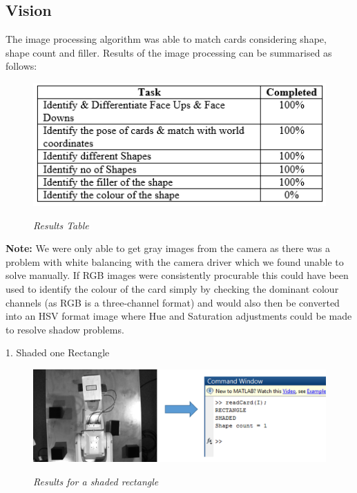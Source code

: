 \subsection{Vision}
The image processing algorithm was able to match cards considering shape, shape count and filler. Results of the image processing can be summarised as follows:
\begin{figure}[position = here]
	\begin{centering}
		\includegraphics[scale=0.8]{./sachiths_images/image7.png}\\
		\caption[]{\textit{Results Table}}
	\end{centering}
\end{figure}

\textbf{Note:} We were only able to get gray images from the camera as there was a problem with white balancing with the camera driver which we found unable to solve manually. If RGB images were consistently procurable this could have been used to identify the colour of the card simply by checking the dominant colour channels (as RGB is a three-channel format) and would also then be converted into an HSV format image where Hue and Saturation adjustments could be made to resolve shadow problems.

1. Shaded one Rectangle
\begin{figure}[position = here]
	\begin{centering}
		\includegraphics[scale=0.5]{./sachiths_images/image9.png}\\
		\caption[]{\textit{Results for a shaded rectangle}}
	\end{centering}
\end{figure}

